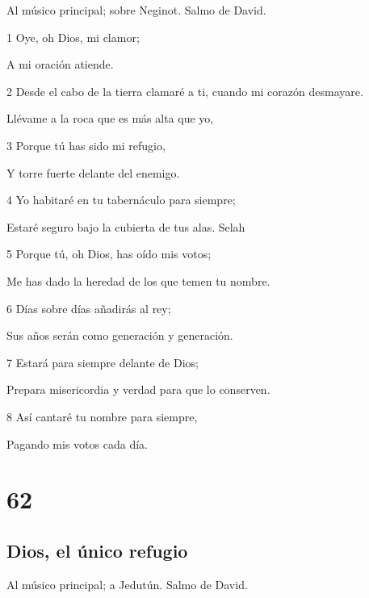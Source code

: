 \par Al músico principal; sobre Neginot. Salmo de David.

\par 1 Oye, oh Dios, mi clamor;
\par A mi oración atiende.
\par 2 Desde el cabo de la tierra clamaré a ti, cuando mi corazón desmayare.
\par Llévame a la roca que es más alta que yo,
\par 3 Porque tú has sido mi refugio,
\par Y torre fuerte delante del enemigo.
\par 4 Yo habitaré en tu tabernáculo para siempre;
\par Estaré seguro bajo la cubierta de tus alas. Selah
\par 5 Porque tú, oh Dios, has oído mis votos;
\par Me has dado la heredad de los que temen tu nombre.
\par 6 Días sobre días añadirás al rey;
\par Sus años serán como generación y generación.
\par 7 Estará para siempre delante de Dios;
\par Prepara misericordia y verdad para que lo conserven.
\par 8 Así cantaré tu nombre para siempre,
\par Pagando mis votos cada día.

\chapter{62}

\section*{Dios, el único refugio}

\par Al músico principal; a Jedutún. Salmo de David.

